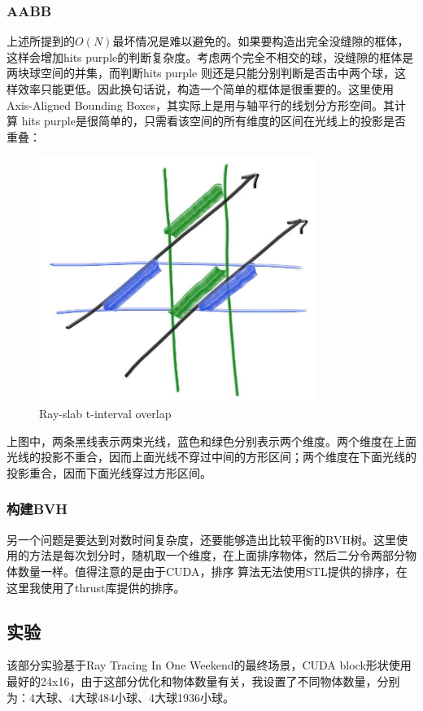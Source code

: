 \documentclass[UTF8, a4paper, 11pt]{article}
\begin{document}
\subsubsection{AABB}
上述所提到的$O(N)$最坏情况是难以避免的。如果要构造出完全没缝隙的框体，这样会增加hits purple的判断复杂度。考虑两个完全不相交的球，没缝隙的框体是两块球空间的并集，而判断hits purple
则还是只能分别判断是否击中两个球，这样效率只能更低。因此换句话说，构造一个简单的框体是很重要的。这里使用Axis-Aligned Bounding Boxes，其实际上是用与轴平行的线划分方形空间。其计算
hits purple是很简单的，只需看该空间的所有维度的区间在光线上的投影是否重叠：
\begin{figure}[H]
    \centering
    \includegraphics[width=0.8\textwidth]{overlap.jpg}
    \caption{Ray-slab t-interval overlap}
\end{figure}
上图中，两条黑线表示两束光线，蓝色和绿色分别表示两个维度。两个维度在上面光线的投影不重合，因而上面光线不穿过中间的方形区间；两个维度在下面光线的投影重合，因而下面光线穿过方形区间。
\subsubsection{构建BVH}
另一个问题是要达到对数时间复杂度，还要能够造出比较平衡的BVH树。这里使用的方法是每次划分时，随机取一个维度，在上面排序物体，然后二分令两部分物体数量一样。值得注意的是由于CUDA，排序
算法无法使用STL提供的排序，在这里我使用了thrust库提供的排序。
\subsection{实验}
该部分实验基于Ray Tracing In One Weekend的最终场景，CUDA block形状使用最好的24x16，由于这部分优化和物体数量有关，我设置了不同物体数量，分别为：4大球、4大球484小球、4大球1936小球。
\end{document}
